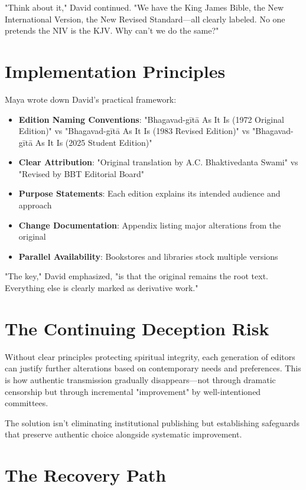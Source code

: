 \documentclass[11pt,twoside]{book}
\begin{document}
"Think about it," David continued. "We have the King James Bible, the New International Version, the New Revised Standard—all clearly labeled. No one pretends the NIV is the KJV. Why can't we do the same?"
\section*{Implementation Principles}
\label{sec:orgb9173c1}

Maya wrote down David's practical framework:

\begin{itemize}
\item \textbf{\textbf{Edition Naming Conventions}}: "Bhagavad-gītā As It Is (1972 Original Edition)" vs "Bhagavad-gītā As It Is (1983 Revised Edition)" vs "Bhagavad-gītā As It Is (2025 Student Edition)"
\item \textbf{\textbf{Clear Attribution}}: "Original translation by A.C. Bhaktivedanta Swami" vs "Revised by BBT Editorial Board"
\item \textbf{\textbf{Purpose Statements}}: Each edition explains its intended audience and approach
\item \textbf{\textbf{Change Documentation}}: Appendix listing major alterations from the original
\item \textbf{\textbf{Parallel Availability}}: Bookstores and libraries stock multiple versions
\end{itemize}

"The key," David emphasized, "is that the original remains the root text. Everything else is clearly marked as derivative work."
\section*{The Continuing Deception Risk}
\label{sec:org6e6f650}

Without clear principles protecting spiritual integrity, each generation of editors can justify further alterations based on contemporary needs and preferences. This is how authentic transmission gradually disappears—not through dramatic censorship but through incremental "improvement" by well-intentioned committees.

The solution isn't eliminating institutional publishing but establishing safeguards that preserve authentic choice alongside systematic improvement.
\section*{The Recovery Path}
\label{sec:org2d54042}
\end{document}

